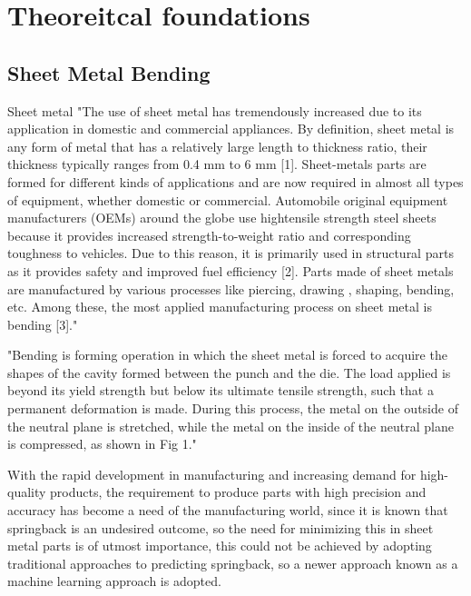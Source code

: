 \chapter{Theoreitcal foundations}

\section{Sheet Metal Bending}
Sheet metal 
"The use of sheet metal has tremendously increased due to its application in domestic and commercial appliances. By definition, sheet metal is any form of metal that has a relatively large length to thickness ratio, their thickness typically ranges from 0.4 mm to 6 mm [1]. Sheet-metals parts are formed for different kinds of applications and are now required in almost all types of equipment, whether domestic or commercial. Automobile original equipment manufacturers (OEMs) around the globe use hightensile strength steel sheets because it provides increased strength-to-weight ratio and corresponding toughness to vehicles. Due to this reason, it is primarily used in structural parts as it provides safety and improved fuel efficiency [2]. Parts made of sheet metals are manufactured by various processes like piercing, drawing , shaping, bending, etc. Among these, the most applied manufacturing process on sheet metal is bending [3]." 
\cite{baig_machinelearningprediction_2021} 

"Bending is forming operation in which the sheet metal is forced to acquire the shapes of the cavity formed between the punch and the die. The load applied is beyond its yield strength but below its ultimate tensile strength, such that a permanent deformation is made. During this process, the metal on
the outside of the neutral plane is stretched, while the metal on the inside of the neutral plane is compressed, as shown in Fig 1." 
\cite{baig_machinelearningprediction_2021} 


With the rapid development in manufacturing and increasing demand for high-quality products, the requirement to produce parts with high precision and accuracy has become a need of the manufacturing world, since it is known that springback is an undesired outcome, so the need for minimizing this in sheet metal parts is of utmost importance, this could not be achieved by adopting traditional approaches to predicting springback, so a newer approach known as a machine learning approach is adopted. 
\cite{baig_machinelearningprediction_2021} 

